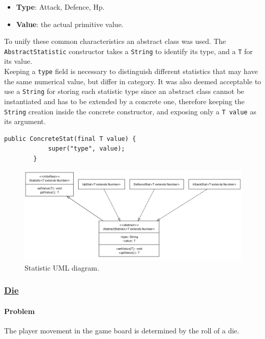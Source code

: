 \documentclass[12pt, a4paper]{report}
\theoremstyle{definition}
\begin{document}
    \begin{itemize}
        \item \textbf{Type}: Attack, Defence, Hp.
        \item \textbf{Value}: the actual primitive value.
    \end{itemize}
    
    To unify these common characteristics an abstract class was used. The \verb|AbstractStatistic| constructor takes a \verb|String| to identify its type, and a
    \verb|T| for its value.\\
    Keeping a \verb|type| field is necessary to distinguish different statistics that may have the same numerical value, but differ in category.
    It was also deemed acceptable to use a \verb|String| for storing each statistic type since an abstract class cannot be instantiated and has to be extended by
    a concrete one, therefore keeping the \verb|String| creation inside the concrete constructor, and exposing only a \verb|T value| as its argument.

    \begin{lstlisting}[caption={Example of a concrete stat constructor.}, gobble=8]
        public ConcreteStat(final T value) {
            super("type", value);
        }
    \end{lstlisting}

    \begin{figure}[h]
    \centering{}
    \caption{Statistic UML diagram.}
    \includegraphics[width=\textwidth]{statistic_uml}
    \end{figure}

    \subsubsection{\underline{Die}}
    \paragraph{Problem}
    The player movement in the game board is determined by the roll of a die.
\end{document}
